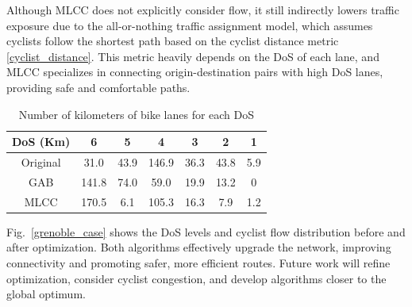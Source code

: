 \documentclass[letterpaper, 10 pt, conference]{ieeeconf}  %
\begin{document}
Although MLCC does not explicitly consider flow, it still indirectly lowers traffic exposure due to the all-or-nothing traffic assignment model, which assumes cyclists follow the shortest path based on the cyclist distance metric \eqref{cyclist_distance}. This metric heavily depends on the DoS of each lane, and MLCC specializes in connecting origin-destination pairs with high DoS lanes, providing safe and comfortable paths.

\begin{table}[h!]
\centering
\begin{tabular}{c|c|c|c|c|c|c}
\hline
DoS (Km) & 6 & 5 & 4 & 3 & 2 & 1 \\ \hline
Original & 31.0 & 43.9 & 146.9 & 36.3 & 43.8 & 5.9 \\
GAB & 141.8 & 74.0 & 59.0 & 19.9 & 13.2 & 0 \\
MLCC & 170.5 & 6.1 & 105.3 & 16.3 & 7.9 & 1.2 \\ \hline
\end{tabular}
\caption{\footnotesize Number of kilometers of bike lanes for each DoS}
\label{table:dos}
\end{table}

Fig.~\ref{grenoble_case} shows the DoS levels and cyclist flow distribution before and after optimization. Both algorithms effectively upgrade the network, improving connectivity and promoting safer, more efficient routes. Future work will refine optimization, consider cyclist congestion, and develop algorithms closer to the global optimum.
\end{document}
